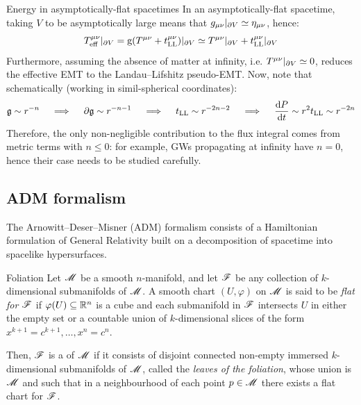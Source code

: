 \begin{observation}{Energy in asymptotically-flat spacetimes}{}
  In an asymptotically-flat spacetime, taking $ V $ to be asymptotically large means that $ g_{\mu \nu} \vert_{\partial V} \simeq \eta_{\mu \nu} $, hence:
  \begin{equation*}
    T_\text{eff}^{\mu \nu} \vert_{\partial V} = \mathrm{g} (T^{\mu \nu} + t_\text{LL}^{\mu \nu}) \vert_{\partial V} \simeq T^{\mu \nu} \vert_{\partial V} + t_\text{LL}^{\mu \nu} \vert_{\partial V}
  \end{equation*}
  Furthermore, assuming the absence of matter at infinity, i.e. $ T^{\mu \nu} \vert_{\partial V} \simeq 0 $, reduces the effective EMT to the Landau--Lifshitz pseudo-EMT. Now, note that schematically (working in simil-spherical coordinates):
  \begin{equation*}
    \mathfrak{g} \sim r^{-n}
    \quad \implies \quad
    \partial \mathfrak{g} \sim r^{-n-1}
    \quad \implies \quad
    t_\text{LL} \sim r^{-2n -2}
    \quad \implies \quad
    \frac{\mathrm{d} P}{\mathrm{d} t} \sim r^2 t_\text{LL} \sim r^{-2n}
  \end{equation*}
  Therefore, the only non-negligible contribution to the flux integral comes from metric terms with $ n \leq 0 $: for example, GWs propagating at infinity have $ n = 0 $, hence their case needs to be studied carefully.
\end{observation}

\subsection{ADM formalism}

The Arnowitt--Deser--Misner (ADM) formalism consists of a Hamiltonian formulation of General Relativity built on a decomposition of spacetime into spacelike hypersurfaces.

\begin{definition}{Foliation}{}
  Let $ \mathscr{M} $ be a smooth $ n $-manifold, and let $ \mathscr{F} $ be any collection of $ k $-dimensional submanifolds of $ \mathscr{M} $. A smooth chart $ (U , \varphi) $ on $ \mathscr{M} $ is said to be \emph{flat for $ \mathscr{F} $} if $ \varphi(U) \subseteq \mathbb{R}^n $ is a cube and each submanifold in $ \mathscr{F} $ intersects $ U $ in either the empty set or a countable union of $ k $-dimensional slices of the form $ x^{k+1} = c^{k+1} , \dots , x^n = c^n $.

  Then, $ \mathscr{F} $ is a  of $ \mathscr{M} $ if it consists of disjoint connected non-empty immersed $ k $-dimensional submanifolds of $ \mathscr{M} $, called the \emph{leaves of the foliation}, whose union is $ \mathscr{M} $ and such that in a neighbourhood of each point $ p \in \mathscr{M} $ there exists a flat chart for $ \mathscr{F} $.
\end{definition}

